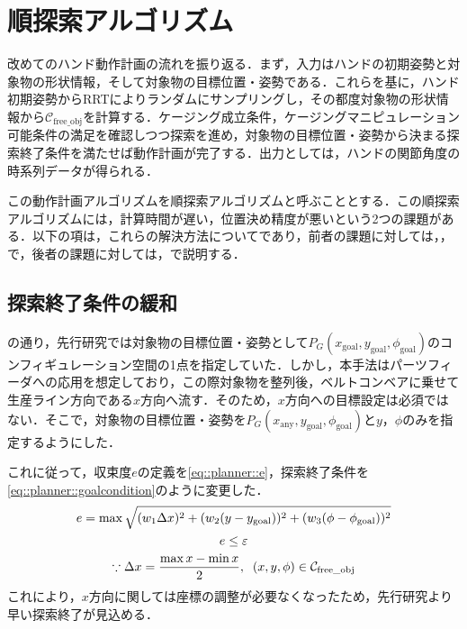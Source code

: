 \documentclass[a4paper,twoside,12pt,papersize, dvipdfmx]{iirthesis}
\begin{document}
\section{順探索アルゴリズム}\label{sec::planner::straight}
改めてのハンド動作計画の流れを振り返る．まず，入力はハンドの初期姿勢と対象物の形状情報，そして対象物の目標位置・姿勢である．これらを基に，ハンド初期姿勢からRRTによりランダムにサンプリングし，その都度対象物の形状情報から$\mathcal{C}_{\mathrm{free\_obj}}$を計算する．ケージング成立条件，ケージングマニピュレーション可能条件の満足を確認しつつ探索を進め，対象物の目標位置・姿勢から決まる探索終了条件を満たせば動作計画が完了する．出力としては，ハンドの関節角度の時系列データが得られる．\par
この動作計画アルゴリズムを順探索アルゴリズムと呼ぶこととする．この順探索アルゴリズムには，計算時間が遅い，位置決め精度が悪いという2つの課題がある．以下の項は，これらの解決方法についてであり，前者の課題に対しては，，で，後者の課題に対しては，で説明する．

\subsection{探索終了条件の緩和}\label{subsec::planner::goalcond}
の通り，先行研究では対象物の目標位置・姿勢として$P_G (x_{\mathrm {goal}}, y_{\mathrm {goal}}, \phi_{\mathrm {goal}})$のコンフィギュレーション空間の1点を指定していた．しかし，本手法はパーツフィーダへの応用を想定しており，この際対象物を整列後，ベルトコンベアに乗せて生産ライン方向である$x$方向へ流す．そのため，$x$方向への目標設定は必須ではない．そこで，対象物の目標位置・姿勢を$P_G (x_{\mathrm {any}}, y_{\mathrm {goal}}, \phi_{\mathrm {goal}})$と$y$，$\phi$のみを指定するようにした．\par
これに従って，収束度$e$の定義を\eqref{eq::planner::e}，探索終了条件を\eqref{eq::planner::goalcondition}のように変更した．
\begin{gather}
e = \max \sqrt{(w_1\Delta x)^2 + (w_2(y-y_{\mathrm{goal}}))^2 + (w_3(\phi-\phi_{\mathrm{goal}}))^2} \label{eq::planner::e} \\
e \leq \varepsilon \label{eq::planner::goalcondition} \\
\because  \Delta x = \dfrac{\max x  - \min x}{2} ,\;\; (x, y, \phi) \in \mathcal{C}_{\mathrm{free\_obj}} \notag
\end{gather}
これにより，$x$方向に関しては座標の調整が必要なくなったため，先行研究より早い探索終了が見込める．
\end{document}
